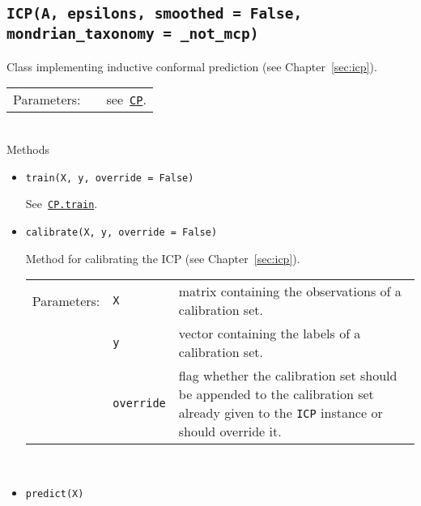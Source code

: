 \documentclass[twoside,11pt]{article}
\def\wo{~\\}
\begin{document}
\begin{appendices}
\begin{itemize}
      \end{itemize}

    \subsection*{\texttt{ICP(A, epsilons, smoothed = False,
        mondrian\_taxonomy = \_not\_mcp)}}

      Class implementing inductive conformal prediction
      (see Chapter~\ref{sec:icp}).
      \\

      \begin{tabu}{llX}
        Parameters: &&see~\hyperref[itm:cp]{\texttt{CP}}.
      \end{tabu}
      \wo
      Methods

      \begin{itemize}

        \item
          \texttt{train(X, y, override = False)}

          See~\hyperref[itm:cp_train]{\texttt{CP.train}}.
          \\

        \item
          \texttt{calibrate(X, y, override = False)}

          Method for calibrating the ICP (see
          Chapter~\ref{sec:icp}).
          \\

          \begin{tabu}{llX}
            Parameters: &\texttt{X}
                        &matrix containing the observations
                         of a calibration set.
                         \\
                        &\texttt{y}
                        &vector containing the labels of
                         a calibration set.
                         \\
                        &\texttt{override}
                        &flag whether the calibration set
                         should be appended to the
                         calibration set already given to
                         the \texttt{ICP} instance or
                         should override it.
          \end{tabu}
          \wo

        \item
          \texttt{predict(X)}


\end{itemize}
\end{appendices}
\end{document}
